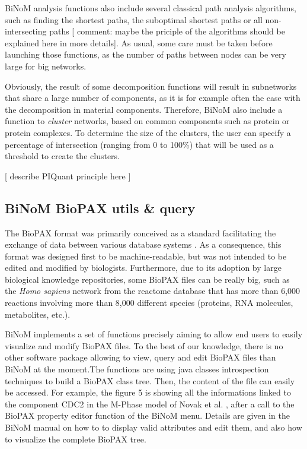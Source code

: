 \documentclass[10pt]{bmc_article}
\newenvironment{bmcformat}{\baselineskip20pt\sloppy\setboolean{publ}{false}}{\baselineskip20pt\sloppy}
\begin{document}
\begin{bmcformat}
BiNoM analysis functions also include several classical path analysis
algorithms, such as finding the shortest paths, the suboptimal shortest paths or
all non-intersecting paths [ comment: maybe the priciple of the algorithms
should be explained here in more details]. As usual, some care must be taken
before launching those functions, as the number of paths between nodes can be
very large for big networks.

Obviously, the result of some decomposition functions will result in subnetworks
that share a large number of components, as it is for example often the case
with the decomposition in material components. Therefore, BiNoM also include a
function to \emph{cluster} networks, based on common components such as protein
or protein complexes. To determine the size of the clusters, the user can
specify a percentage of intersection (ranging from 0 to 100\%) that will be used
as a threshold to create the clusters.

[ describe PIQuant principle here ]

\subsection*{BiNoM BioPAX utils \& query}
The BioPAX format was primarily conceived as a standard facilitating the
exchange of data between various database systems \cite{demir2010biopax}. As a
consequence, this format was designed first to be machine-readable, but was not
intended
to be edited and modified by biologists. Furthermore, due to its adoption by
large biological knowledge repositories, some BioPAX files can be really big,
such as the \textit{Homo sapiens} network from the reactome database
\cite{joshi2005reactome} that has more than 6,000 reactions involving more than
8,000 different species (proteins, RNA molecules, metabolites, etc.).

BiNoM implements a set of functions precisely aiming to allow end users to
easily visualize and modify BioPAX files. To the best of our knowledge, there is
no other software package allowing to view, query and edit BioPAX files than
BiNoM at the moment.The functions are using
java classes introspection techniques to build a BioPAX class tree. Then, the
content of the file can easily be accessed. For example, the figure 5 is
showing all the informations linked to the component CDC2 in the M-Phase model
of Novak et al. \cite{novak1998model}, after a call to the BioPAX property
editor function of the BiNoM menu. Details are given in the BiNoM manual on how
to to display valid attributes and edit them, and also how to visualize the
complete BioPAX tree.


\end{bmcformat}
\end{document}
